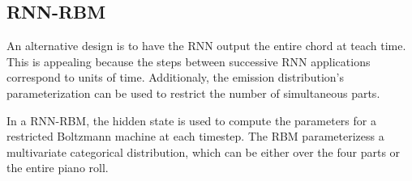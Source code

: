 \subsection{RNN-RBM}
An alternative design is to have the RNN output the entire chord at teach time.
This is appealing because the steps between successive RNN applications
correspond to units of time. Additionaly, the emission distribution's parameterization
can be used to restrict the number of simultaneous parts.

In a RNN-RBM, the hidden state is used to compute the parameters for a restricted Boltzmann
machine at each timestep. The RBM parameterizess a multivariate categorical distribution,
which can be either over the four parts or the entire piano roll.



